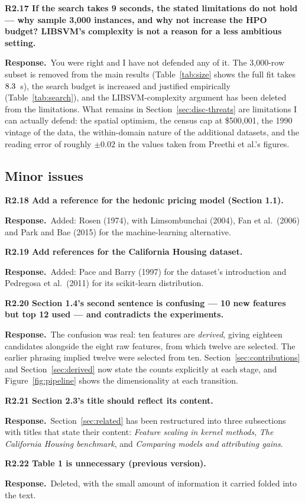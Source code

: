 \documentclass[11pt,a4paper]{article}
\newcommand{\reply}{\par\noindent\textbf{Response.}\ }
\newcommand{\pt}[1]{\par\medskip\noindent\textbf{#1}\par}
\begin{document}
\pt{R2.17 If the search takes 9 seconds, the stated limitations do not hold --- why sample
3{,}000 instances, and why not increase the HPO budget? LIBSVM's complexity is not a reason
for a less ambitious setting.}
\reply You were right and I have not defended any of it. The 3{,}000-row subset is removed
from the main results (Table~\ref{tab:size} shows the full fit takes $8.3$~s), the search
budget is increased and justified empirically (Table~\ref{tab:search}), and the LIBSVM-complexity argument
has been deleted from the limitations. What remains in Section~\ref{sec:disc-threats} are limitations I can
actually defend: the spatial optimism, the census cap at \$500{,}001, the 1990 vintage of the
data, the within-domain nature of the additional datasets, and the reading error of roughly
$\pm 0.02$ in the values taken from Preethi et al.'s figures.

\subsection*{Minor issues}

\pt{R2.18 Add a reference for the hedonic pricing model (Section 1.1).}
\reply Added: Rosen (1974), with Limsombunchai (2004), Fan et al.\ (2006) and Park and Bae
(2015) for the machine-learning alternative.

\pt{R2.19 Add references for the California Housing dataset.}
\reply Added: Pace and Barry (1997) for the dataset's introduction and Pedregosa et al.\
(2011) for its scikit-learn distribution.

\pt{R2.20 Section 1.4's second sentence is confusing --- 10 new features but top 12 used ---
and contradicts the experiments.}
\reply The confusion was real: ten features are \emph{derived}, giving eighteen candidates
alongside the eight raw features, from which twelve are selected. The earlier phrasing
implied twelve were selected from ten. Section~\ref{sec:contributions} and Section~\ref{sec:derived} now state the counts
explicitly at each stage, and Figure~\ref{fig:pipeline} shows the dimensionality at each transition.

\pt{R2.21 Section 2.3's title should reflect its content.}
\reply Section~\ref{sec:related} has been restructured into three subsections with titles that state their
content: \emph{Feature scaling in kernel methods}, \emph{The California Housing benchmark},
and \emph{Comparing models and attributing gains}.

\pt{R2.22 Table 1 is unnecessary (previous version).}
\reply Deleted, with the small amount of information it carried folded into the text.
\end{document}
